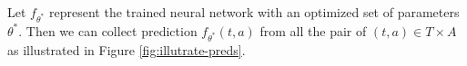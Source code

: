 Let $f_{\theta^*}$ represent the trained neural network with an optimized set of parameters $\theta^*$. 
Then we can collect prediction $f_{\theta^*}(t, a)$ from all the pair of $(t,a) \in T \times A$ as illustrated in Figure \ref{fig:illutrate-preds}.



